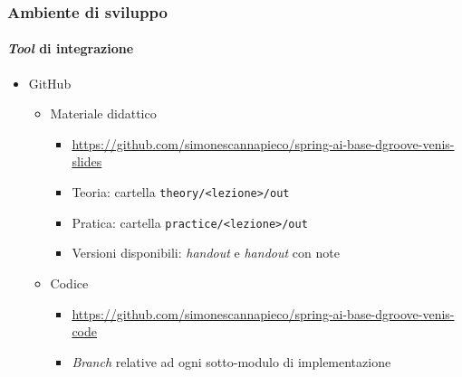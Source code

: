 \begin{frame}[t,fragile] \frametitle{Ambiente di sviluppo}
\framesubtitle{\textit{Tool} di integrazione}
{\small
\begin{itemize}[leftmargin=10pt,align=right]
    \item[\alert{\faArrowCircleRight}] GitHub
    \begin{itemize}[leftmargin=10pt,align=right]
        \item[\alertedcircled{1}] Materiale didattico
            \begin{itemize}[leftmargin=10pt,align=right]
            \item[\alert{\faExternalLinkSquare}] \href{https://github.com/simonescannapieco/spring-ai-base-dgroove-venis-slides}{https://github.com/simonescannapieco/spring-ai-base-dgroove-venis-slides}
            \item[\alert{\faArrowCircleRight}] \alert{Teoria:} cartella \texttt{theory/<lezione>/out}
            \item[\alert{\faArrowCircleRight}] \alert{Pratica:} cartella \texttt{practice/<lezione>/out}
            \item[\alert{\faArrowCircleRight}] Versioni disponibili:  \textit{handout} e  \textit{handout} con note
        \end{itemize}    
        \item[\alertedcircled{2}] Codice 
        \begin{itemize}[leftmargin=10pt,align=right]
            \item[\alert{\faExternalLinkSquare}] \href{https://github.com/simonescannapieco/spring-ai-base-dgroove-venis-code}{https://github.com/simonescannapieco/spring-ai-base-dgroove-venis-code}      
            \item[\alert{\faArrowCircleRight}] \textit{Branch} relative ad ogni sotto-modulo di implementazione
        \end{itemize}
    \end{itemize}  
\end{itemize}
}
\end{frame}    
%
